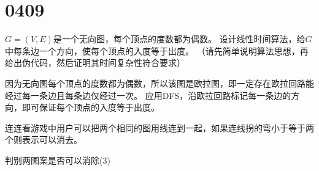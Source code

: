 \section{0409}\label{sec:0409}
\begin{questions}

    \question $G=(V,E)$是一个无向图，每个顶点的度数都为偶数。
    设计线性时间算法，给$G$中每条边一个方向，使每个顶点的入度等于出度。
    （请先简单说明算法思想，再给出伪代码，然后证明其时间复杂性符合要求）

    \begin{solution}
        因为无向图每个顶点的度数都为偶数，所以该图是欧拉图，即一定存在欧拉回路能经过每一条边且每条边仅经过一次。
        应用DFS，沿欧拉回路标记每一条边的方向，即可保证每个顶点的入度等于出度。
    \end{solution}

    \question 连连看游戏中用户可以把两个相同的图用线连到一起，如果连线拐的弯小于等于两个则表示可以消去。


    \begin{algorithm}[!htp]
        \caption{判别两图案是否可以消除(3)}\label{0409:2:3}
        \begin{algorithmic}[1]


\end{algorithmic}
\end{algorithm}
\end{questions}
